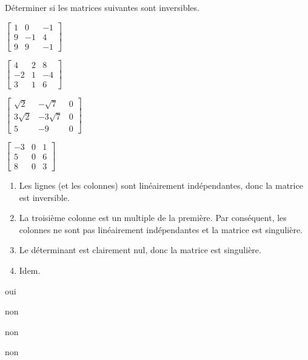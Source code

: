 \begin{exercice}
  Déterminer si les matrices suivantes sont inversibles.
  \begin{enumerate}
    \begin{multicols}{2}
    \item $%
      \begin{bmatrix}
        1 & 0 & -1 \\ 9 & -1 & 4 \\ 9 & 9 & -1
      \end{bmatrix}$
    \item $%
      \begin{bmatrix}
        4 & 2 & 8 \\ -2 & 1 & -4 \\ 3 & 1 & 6
      \end{bmatrix}$
    \end{multicols}
    \begin{multicols}{2}
    \item $%
      \begin{bmatrix}
        \sqrt{2} & -\sqrt{7} & 0 \\
        3\sqrt{2} & -3 \sqrt{7} & 0 \\
        5 & -9 & 0
      \end{bmatrix}$
    \item $%
      \begin{bmatrix}
        -3 & 0 & 1 \\ 5 & 0 & 6 \\ 8 & 0 & 3
      \end{bmatrix}$
    \end{multicols}
  \end{enumerate}
  \begin{sol}
    \begin{enumerate}
    \item Les lignes (et les colonnes) sont linéairement
      indépendantes, donc la matrice est inversible.
    \item La troisième colonne est un multiple de la première. Par
      conséquent, les colonnes ne sont pas linéairement indépendantes
      et la matrice est singulière.
    \item Le déterminant est clairement nul, donc la matrice est
      singulière.
    \item Idem.
    \end{enumerate}
  \end{sol}
  \begin{rep}
    \begin{inparaenum}
    \item oui
    \item non
    \item non
    \item non
    \end{inparaenum}
  \end{rep}
\end{exercice}

